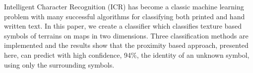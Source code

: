 
Intelligent Character Recognition (ICR) has become a classic machine learning
problem with many successful algorithms for classifying both printed and hand
written text. In this paper, we create a classifier which classifies texture
based symbols of terrains on maps in two dimensions. Three classification
methods are implemented and the results show that the proximity based approach,
presented here, can predict with high confidence, 94\%, the identity of an
unknown symbol, using only the surrounding symbols.

